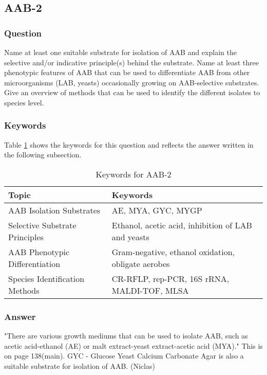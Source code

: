 \subsection{AAB-2}
\subsubsection*{Question}
Name at least one suitable substrate for isolation of AAB and explain the selective and/or indicative principle(s) behind the substrate. Name at least three phenotypic features of AAB that can be used to differentiate AAB from other microorganisms (LAB, yeasts) occasionally growing on AAB-selective substrates. Give an overview of methods that can be used to identify the different isolates to species level. 

\subsubsection*{Keywords}
Table \ref{tab:KW-AAB2} shows the keywords for this question and reflects the answer written in the following subsection.
\begin{table}[h]
    \centering
    \caption{Keywords for AAB-2} 
    \label{tab:KW-AAB2}
    \begin{tabular}{l|l}
        \textbf{Topic} & \textbf{Keywords} \\
        \hline
        AAB Isolation Substrates & AE, MYA, GYC, MYGP \\
        Selective Substrate Principles & Ethanol, acetic acid, inhibition of LAB and yeasts \\
        AAB Phenotypic Differentiation & Gram-negative, ethanol oxidation, obligate aerobes \\
        Species Identification Methods & CR-RFLP, rep-PCR, 16S rRNA, MALDI-TOF, MLSA \\
    \end{tabular}
\end{table}

\subsubsection*{Answer}
"There are various growth mediums that can be used to isolate AAB, such as acetic acid-ethanol (AE) or malt extract-yeast extract-acetic acid (MYA)."
This is on page 138(main).
GYC - Glucose Yeast Calcium Carbonate Agar is also a suitable substrate for isolation of AAB. (Niclas)

